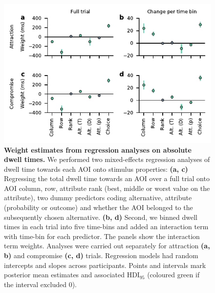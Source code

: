 \documentclass[11pt, a4paper]{article}
\begin{document}
\begin{refsection}
\begin{figure}
\centering
\includegraphics[scale=1]{../figures/S_dwell-regression_weights.pdf}
\caption{\textbf{Weight estimates from regression analyses on absolute dwell times.} We performed two mixed-effects regression analyses of dwell time towards each AOI onto stimulus properties: \textbf{(a, c)} Regressing the total dwell time towards an AOI over a full trial onto AOI column, row, attribute rank (best, middle or worst value on the attribute), two dummy predictors coding alternative, attribute (probability or outcome) and whether the AOI belonged to the subsequently chosen alternative. \textbf{(b, d)} Second, we binned dwell times in each trial into five time-bins and added an interaction term with time-bin for each predictor. The panels show the interaction term weights. Analyses were carried out separately for attraction \textbf{(a, b)} and compromise \textbf{(c, d)} trials. Regression models had random intercepts and slopes across participants. Points and intervals mark posterior mean estimates and associated HDI$_{95}$ (coloured green if the interval excluded 0).}
\label{fig:dwell-regression-weights}
\end{figure}


\end{refsection}
\end{document}
